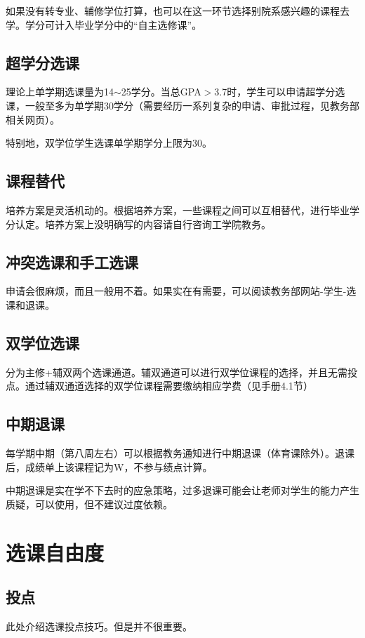 \documentclass[11pt,oneside]{book}
\begin{document}
如果没有转专业、辅修学位打算，也可以在这一环节选择别院系感兴趣的课程去学。学分可计入毕业学分中的“自主选修课”。

\subsection{超学分选课}
理论上单学期选课量为14$\sim$25学分。当总GPA$>$3.7时，学生可以申请超学分选课，一般至多为单学期30学分（需要经历一系列复杂的申请、审批过程，见教务部相关网页）。

特别地，双学位学生选课单学期学分上限为30。

\subsection{课程替代}
培养方案是灵活机动的。根据培养方案，一些课程之间可以互相替代，进行毕业学分认定。培养方案上没明确写的内容请自行咨询工学院教务。

\subsection{冲突选课和手工选课}
申请会很麻烦，而且一般用不着。如果实在有需要，可以阅读教务部网站-学生-选课和退课。

\subsection{双学位选课}
分为主修+辅双两个选课通道。辅双通道可以进行双学位课程的选择，并且无需投点。通过辅双通道选择的双学位课程需要缴纳相应学费（见手册4.1节）

\subsection{中期退课}
每学期中期（第八周左右）可以根据教务通知进行中期退课（体育课除外）。退课后，成绩单上该课程记为W，不参与绩点计算。

中期退课是实在学不下去时的应急策略，过多退课可能会让老师对学生的能力产生质疑，可以使用，但不建议过度依赖。



\section{选课自由度}
\subsection{投点}
此处介绍选课投点技巧。但是并不很重要。
\end{document}
